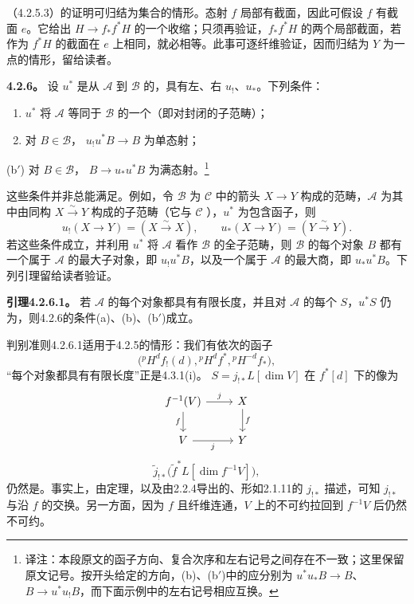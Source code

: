 （4.2.5.3）的证明可归结为集合的情形。态射 $f$ 局部有截面，因此可假设 $f$ 有截面 $e$。它给出 $H\to f_*f^*H$ 的一个收缩；只须再验证，$f_*f^*H$ 的两个局部截面，若作为 $f^*H$ 的截面在 $e$ 上相同，就必相等。此事可逐纤维验证，因而归结为 $Y$ 为一点的情形，留给读者。

\par\medskip\noindent\textbf{4.2.6。} 设 $u^*$ 是从 $\mathscr A$ 到 $\mathscr B$ 的，具有左、右 $u_!$、$u_*$。下列条件：
\begin{enumerate}[label=(\alph*)]
\item $u^*$ 将 $\mathscr A$ 等同于 $\mathscr B$ 的一个（即对封闭的子范畴）；
\item 对 $B\in\mathscr B$， $u_!u^*B\to B$ 为单态射；
\end{enumerate}
\noindent(b$'$) 对 $B\in\mathscr B$， $B\to u_*u^*B$ 为满态射。\footnote{译注：本段原文的函子方向、复合次序和左右记号之间存在不一致；这里保留原文记号。按开头给定的方向，(b)、(b$'$)中的应分别为 $u^*u_*B\to B$、$B\to u^*u_!B$，而下面示例中的左右记号相应互换。}

这些条件并非总能满足。例如，令 $\mathscr B$ 为 $\mathscr C$ 中的箭头 $X\to Y$ 构成的范畴，$\mathscr A$ 为其中由同构 $X\xrightarrow\sim Y$ 构成的子范畴（它与 $\mathscr C$ ），$u^*$ 为包含函子，则
\[u_!(X\to Y)=(X\xrightarrow\sim X),\qquad u_*(X\to Y)=(Y\xrightarrow\sim Y).\]
若这些条件成立，并利用 $u^*$ 将 $\mathscr A$ 看作 $\mathscr B$ 的全子范畴，则 $\mathscr B$ 的每个对象 $B$ 都有一个属于 $\mathscr A$ 的最大子对象，即 $u_!u^*B$，以及一个属于 $\mathscr A$ 的最大商，即 $u_*u^*B$。下列引理留给读者验证。

\par\medskip\noindent\textbf{引理4.2.6.1。} 若 $\mathscr A$ 的每个对象都具有有限长度，并且对 $\mathscr A$ 的每个 $S$，$u^*S$ 仍为，则4.2.6的条件(a)、(b)、(b$'$)成立。

判别准则4.2.6.1适用于4.2.5的情形：我们有依次的函子
\[\bigl({}^pH^df_!(d),{}^pH^df^*,{}^pH^{-d}f_*\bigr),\]
“每个对象都具有有限长度”正是4.3.1(i)。 $S=j_{!*}L[\dim V]$ 在 $f^*[d]$ 下的像为
\[
\begin{tikzcd}[ampersand replacement=\&]
f^{-1}(V)\arrow[r,"{\tilde j}"]\arrow[d,"{\tilde f}"']\&X\arrow[d,"{f}"]\\
V\arrow[r,"{j}"']\&Y
\end{tikzcd}
\]
\[\tilde j_{!*}\bigl(\tilde f^*L[\dim f^{-1}V]\bigr),\]
仍然是。事实上，由定理，以及由2.2.4导出的、形如2.1.11的 $j_{!*}$ 描述，可知 $j_{!*}$ 与沿 $f$ 的交换。另一方面，因为 $f$ 且纤维连通，$V$ 上的不可约拉回到 $f^{-1}V$ 后仍然不可约。

